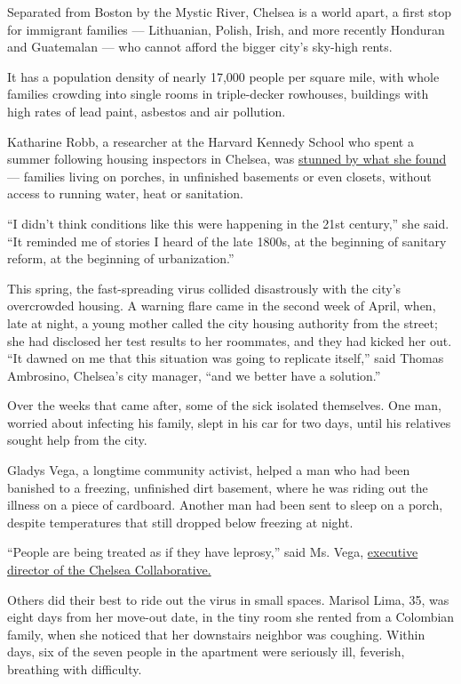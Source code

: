 Separated from Boston by the Mystic River, Chelsea is a world apart, a
first stop for immigrant families --- Lithuanian, Polish, Irish, and
more recently Honduran and Guatemalan --- who cannot afford the bigger
city's sky-high rents.

It has a population density of nearly 17,000 people per square mile,
with whole families crowding into single rooms in triple-decker
rowhouses, buildings with high rates of lead paint, asbestos and air
pollution.

Katharine Robb, a researcher at the Harvard Kennedy School who spent a
summer following housing inspectors in Chelsea, was
\href{https://dash.harvard.edu/handle/1/40976724}{stunned by what she
found} --- families living on porches, in unfinished basements or even
closets, without access to running water, heat or sanitation.

``I didn't think conditions like this were happening in the 21st
century,'' she said. ``It reminded me of stories I heard of the late
1800s, at the beginning of sanitary reform, at the beginning of
urbanization.''

This spring, the fast-spreading virus collided disastrously with the
city's overcrowded housing. A warning flare came in the second week of
April, when, late at night, a young mother called the city housing
authority from the street; she had disclosed her test results to her
roommates, and they had kicked her out. ``It dawned on me that this
situation was going to replicate itself,'' said Thomas Ambrosino,
Chelsea's city manager, ``and we better have a solution.''

Over the weeks that came after, some of the sick isolated themselves.
One man, worried about infecting his family, slept in his car for two
days, until his relatives sought help from the city.

Gladys Vega, a longtime community activist, helped a man who had been
banished to a freezing, unfinished dirt basement, where he was riding
out the illness on a piece of cardboard. Another man had been sent to
sleep on a porch, despite temperatures that still dropped below freezing
at night.

``People are being treated as if they have leprosy,'' said Ms. Vega,
\href{https://www.chelseacollab.org/meet-the-team-1}{executive director
of the Chelsea Collaborative.}

Others did their best to ride out the virus in small spaces. Marisol
Lima, 35, was eight days from her move-out date, in the tiny room she
rented from a Colombian family, when she noticed that her downstairs
neighbor was coughing. Within days, six of the seven people in the
apartment were seriously ill, feverish, breathing with difficulty.

